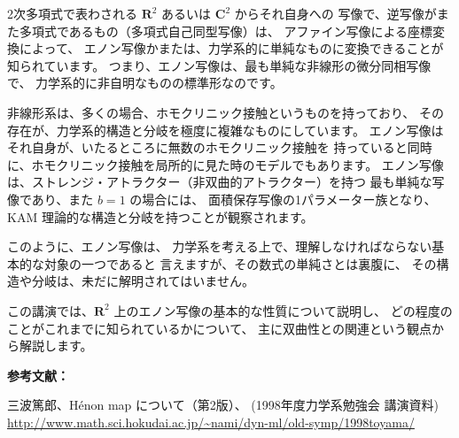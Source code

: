 \documentclass[uplatex,dvipdfmx]{jlreq}
\begin{document}
2次多項式で表わされる $\mathbf{R}^2$ あるいは $\mathbf{C}^2$ からそれ自身への
写像で、逆写像がまた多項式であるもの（多項式自己同型写像）は、
アファイン写像による座標変換によって、
エノン写像かまたは、力学系的に単純なものに変換できることが知られています。
つまり、エノン写像は、最も単純な非線形の微分同相写像で、
力学系的に非自明なものの標準形なのです。

非線形系は、多くの場合、ホモクリニック接触というものを持っており、
その存在が、力学系的構造と分岐を極度に複雑なものにしています。
エノン写像はそれ自身が、いたるところに無数のホモクリニック接触を
持っていると同時に、ホモクリニック接触を局所的に見た時のモデルでもあります。
エノン写像は、ストレンジ・アトラクター（非双曲的アトラクター）を持つ
最も単純な写像であり、また $b=1$ の場合には、
面積保存写像の1パラメーター族となり、
KAM 理論的な構造と分岐を持つことが観察されます。

このように、エノン写像は、
力学系を考える上で、理解しなければならない基本的な対象の一つであると
言えますが、その数式の単純さとは裏腹に、
その構造や分岐は、未だに解明されてはいません。

この講演では、$\mathbf{R}^2$ 上のエノン写像の基本的な性質について説明し、
どの程度のことがこれまでに知られているかについて、
主に双曲性との関連という観点から解説します。

\bigskip
\noindent\textbf{参考文献：}
\begin{enumerate}[{[S]}]
\item[{[S]}] 三波篤郎、Hénon map について（第2版）、
(1998年度力学系勉強会 講演資料)\\
\url{http://www.math.sci.hokudai.ac.jp/~nami/dyn-ml/old-symp/1998toyama/}
\end{enumerate}
\end{document}
